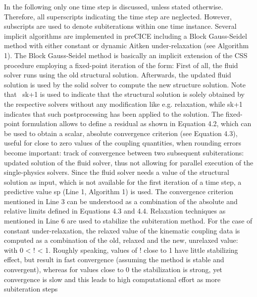 In the following only one time step is discussed, unless stated otherwise. Therefore, all superscripts
indicating the time step are neglected. However, subscripts are used to denote subiterations within one
time instance.
Several implicit algorithms are implemented in preCICE including a Block Gauss-Seidel method with
either constant or dynamic Aitken under-relaxation (see Algorithm 1). The Block Gauss-Seidel method
is basically an implicit extension of the CSS procedure employing a fixed-point iteration of the form:
First of all, the fluid solver runs using the old structural solution. Afterwards, the updated fluid solution
is used by the solid solver to compute the new structure solution. Note that ~sk+1 is used to indicate
that the structural solution is solely obtained by the respective solvers without any modification like
e.g. relaxation, while sk+1 indicates that such postprocessing has been applied to the solution. The
fixed-point formulation allows to define a residual as shown in Equation 4.2, which can be used to obtain
a scalar, absolute convergence criterion (see Equation 4.3), useful for close to zero values of the coupling
quantities, when rounding errors become important:
track of convergence between two subsequent subiterations:
updated solution of the fluid solver, thus not allowing for parallel execution of the single-physics solvers.
Since the fluid solver needs a value of the structural solution as input, which is not available for the first
iteration of a time step, a predictive value sp (Line 1, Algorithm 1) is used. The convergence criterion
mentioned in Line 3 can be understood as a combination of the absolute and relative limits defined in
Equations 4.3 and 4.4.
Relaxation techniques as mentioned in Line 6 are used to stabilize the subiteration method. For the
case of constant under-relaxation, the relaxed value of the kinematic coupling data is computed as a
combination of the old, relaxed and the new, unrelaxed value:
with 0 < ! < 1. Roughly speaking, values of ! close to 1 have little stabilizing effect, but result in fast
convergence (assuming the method is stable and convergent), whereas for values close to 0 the stabilization
is strong, yet convergence is slow and this leads to high computational effort as more subiteration steps
